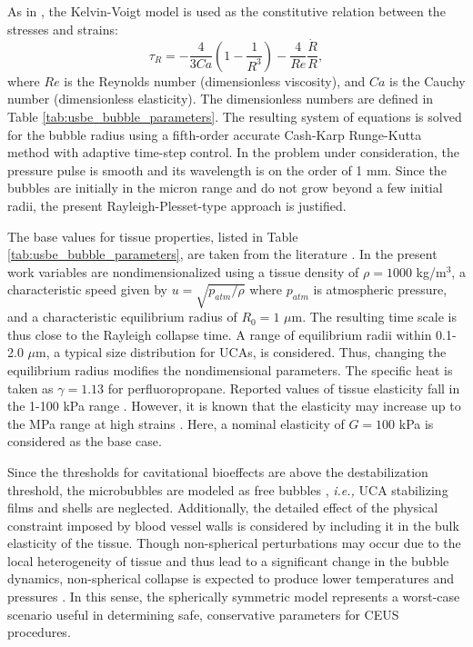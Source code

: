 As in \cite{Yang2005}, the Kelvin-Voigt model is used as the
constitutive relation between the stresses and strains:
\begin{equation}
  \tau_R = -\frac{4}{3Ca}\left(1-\frac{1}{R^3}\right) - \frac{4}{Re}\frac{\dot{R}}{R},
\end{equation}
where $Re$ is the Reynolds number (dimensionless viscosity), and $Ca$
is the Cauchy number (dimensionless elasticity).  The dimensionless
numbers are defined in Table
\ref{tab:usbe_bubble_parameters}.  %
The resulting system of equations is solved for the bubble radius
using a fifth-order accurate Cash-Karp Runge-Kutta method with
adaptive time-step control. In the problem under consideration, the
pressure pulse is smooth and its wavelength is on the order of 1
mm. Since the bubbles are initially in the micron range and do not
grow beyond a few initial radii, the present Rayleigh-Plesset-type
approach is justified.

The base values for tissue properties, listed in Table
\ref{tab:usbe_bubble_parameters}, are taken from the literature
\cite[]{Apfel1991,Yang2005}. In the present work variables are
nondimensionalized using a tissue density of $\rho=1000$ kg/m$^3$, a
characteristic speed given by $u=\sqrt{p_{atm}/\rho}$ where $p_{atm}$
is atmospheric pressure, and a characteristic equilibrium radius of
$R_0=1$ $\mu$m. The resulting time scale is thus close to the Rayleigh
collapse time.  A range of equilibrium radii within 0.1-2.0 $\mu$m, a
typical size distribution for UCAs, is considered. Thus, changing the
equilibrium radius modifies the nondimensional parameters.  The
specific heat is taken as $\gamma =1.13$ for
perfluoropropane. Reported values of tissue elasticity fall in the
1-100 kPa range \cite[]{Arda2011%
}. However, it is known that the elasticity may increase up to the MPa
range at high strains \cite[]{Krouskop1998}.  Here, a nominal
elasticity of $G=100$ kPa is considered as the base case.

Since the thresholds for cavitational bioeffects are above the
destabilization threshold, the microbubbles are modeled as free
bubbles \cite[]{Sboros2002,Marmottant2005}, \textit{i.e.,} UCA
stabilizing films and shells are neglected.  Additionally, the
detailed effect of the physical constraint imposed by blood vessel
walls is considered by including it in the bulk elasticity of the
tissue. Though non-spherical perturbations may occur due to the local
heterogeneity of tissue and thus lead to a significant change in the
bubble dynamics, non-spherical collapse is expected to produce lower
temperatures and pressures \cite[]{Johnsen2009}.  In this sense, the
spherically symmetric model represents a worst-case scenario useful in
determining safe, conservative parameters for CEUS procedures.

